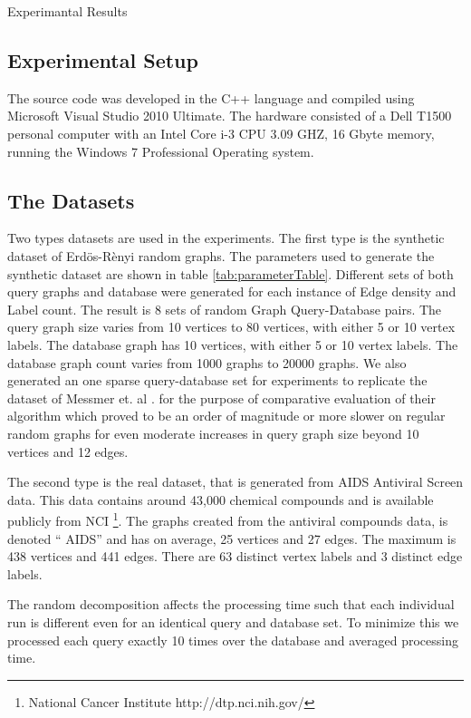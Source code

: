 Experimantal Results

\subsection{Experimental Setup}
The source code was developed in the C++ language and compiled using Microsoft Visual Studio 2010 Ultimate. The hardware consisted of a Dell T1500 personal computer with an
Intel Core i-3 CPU 3.09 GHZ, 16 Gbyte memory, running the Windows 7 Professional Operating system.

\subsection{The Datasets}

Two types datasets are used in the experiments. The first type is the synthetic dataset of Erd\"{o}s-R\`{e}nyi random graphs. The parameters used to generate the synthetic dataset are shown in table \ref{tab:parameterTable}. Different sets of both query graphs and database were generated for each instance of Edge density and Label count. The result is 8 sets of random Graph Query-Database pairs. The query graph size varies from 10 vertices to 80 vertices, with either 5 or 10 vertex labels. The database graph has 10 vertices, with either 5 or 10 vertex labels. The database graph count varies from 1000 graphs to 20000 graphs. We also generated an one sparse query-database set for experiments to replicate the dataset of Messmer et. al \cite{messmer_bunke2000}. for the purpose of comparative evaluation of their algorithm which proved to be an order of magnitude or more slower on regular random graphs for even moderate increases in query graph size beyond 10 vertices and 12 edges.

The second type is the real dataset, that is generated from AIDS Antiviral Screen data. This data contains around 43,000 chemical compounds and is available publicly from NCI \footnote{National Cancer Institute http://dtp.nci.nih.gov/}. The graphs created from the antiviral compounds data, is denoted `` AIDS'' and has on average, 25 vertices and 27 edges. The maximum is 438 vertices and 441 edges. There are 63 distinct vertex labels and 3 distinct edge labels.

The random decomposition affects the processing time such that each individual run is different even for an identical query and database set. To minimize this we processed each query exactly 10 times over the database and averaged processing time.

